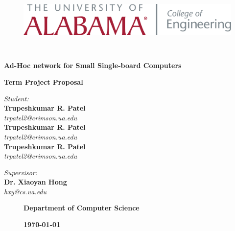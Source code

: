 \begin{titlepage}
	\begin{figure}[t]
		\begin{minipage}{\textwidth}
			\centering
			\includegraphics[scale=0.35]{Images/UA/OfficLogo-Engineering.png}
		\end{minipage}
	\end{figure}

	\quad\\
	\vspace{0.5in}
	\centering
	\begin{spacing}{2.0}
		{ \textbf{\LARGE Ad-Hoc network for Small Single-board Computers}}
	\end{spacing}
	
	\vspace{1.5in}
	\textbf{\Large Term Project Proposal}
	\vspace{3.5in}

	\begin{minipage}{0.49\textwidth}
		\begin{flushleft}
			\textit{{Student:}} \\
			{\textbf{Trupeshkumar R. Patel}}\\
			\textsl{trpatel2@crimson.ua.edu}\\
			{\textbf{Trupeshkumar R. Patel}}\\
			\textsl{trpatel2@crimson.ua.edu}\\
			{\textbf{Trupeshkumar R. Patel}}\\
			\textsl{trpatel2@crimson.ua.edu}
		\end{flushleft}
	\end{minipage}
	\begin{minipage}{0.5\textwidth}
		\begin{flushright}
			\textit{{Supervisor:}} \\
			{\textbf{Dr. Xiaoyan Hong}}\\
			\textsl{hxy@cs.ua.edu}
		\end{flushright}
	\end{minipage}

	\begin{figure}[b]
		\begin{minipage}{0.55\textwidth}
			\begin{flushleft}
				\textbf{\large Department of Computer Science}
			\end{flushleft}
		\end{minipage}
		\hfill
		\begin{minipage}{0.35\textwidth}
			\begin{flushright}
				\textsc{\textbf{\today}}
			\end{flushright}
		\end{minipage}
	\end{figure}

\end{titlepage}
